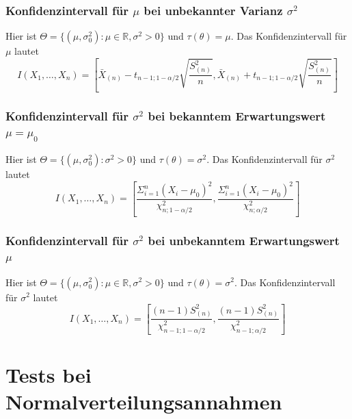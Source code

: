 \documentclass[
	ngerman,
	accentcolor=9c,%
	type=intern,
	marginpar=false
	]{tudapub}
\begin{document}
                \subsubsection*{Konfidenzintervall für $\mu$ bei unbekannter Varianz $\sigma^2$}
                    Hier ist $\Theta = \{(\mu, \sigma^2_0):\mu \in \mathbb{R}, \sigma^2 > 0\}$ und $\tau(\theta) = \mu$. Das Konfidenzintervall für $\mu$ lautet
                    \begin{equation*}
                        I(X_1,\dots,X_n)=\left[\bar{X}_{(n)}-t_{n-1;1-\alpha/2}\sqrt{\dfrac{S^2_{(n)}}{n}},\bar{X}_{(n)}+t_{n-1;1-\alpha/2}\sqrt{\dfrac{S^2_{(n)}}{n}}\right]
                    \end{equation*}
                \subsubsection*{Konfidenzintervall für $\sigma^2$ bei bekanntem Erwartungswert $\mu = \mu_0$}
                    Hier ist $\Theta = \{(\mu, \sigma^2_0):\sigma^2 > 0\}$ und $\tau(\theta) = \sigma^2$. Das Konfidenzintervall für $\sigma^2$ lautet
                    \begin{equation*}
                        I(X_1,\dots,X_n)=\left[
                            \dfrac{\Sigma_{i=1}^n (X_i-\mu_0)^2}{\chi^2_{n;1-\alpha/2}}
                            ,
                            \dfrac{\Sigma_{i=1}^n (X_i-\mu_0)^2}{\chi^2_{n;\alpha/2}}
                        \right]
                    \end{equation*}
                \subsubsection*{Konfidenzintervall für $\sigma^2$ bei unbekanntem Erwartungswert $\mu$}
                    Hier ist $\Theta = \{(\mu, \sigma^2_0):\mu \in \mathbb{R},\sigma^2 > 0\}$ und $\tau(\theta) = \sigma^2$. Das Konfidenzintervall für $\sigma^2$ lautet
                    \begin{equation*}
                        I(X_1,\dots,X_n)=\left[
                            \dfrac{(n-1)S^2_{(n)}}{\chi^2_{n-1;1-\alpha/2}}
                            ,
                            \dfrac{(n-1)S^2_{(n)}}{\chi^2_{n-1;\alpha/2}}
                        \right]
                    \end{equation*}
                    \newpage
        \section{Tests bei Normalverteilungsannahmen}
\end{document}
